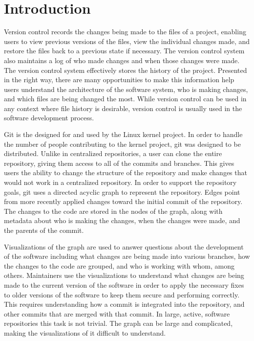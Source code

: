 \chapter{Introduction}

Version control records the changes being made to the files of a
project, enabling users to view previous versions of the files, view the
individual changes made, and restore the files back to a previous state
if necessary. The version control system also maintains a log of who
made changes and when those changes were made. The version control
system effectively stores the history of the project. Presented in the
right way, there are many opportunities to make this information help
users understand the architecture of the software system, who is making
changes, and which files are being changed the most. While version
control can be used in any context where file history is desirable,
version control is usually used in the software development process.

Git is the  designed for and used by
the Linux kernel project. In order to handle the number of people
contributing to the kernel project, git was designed to be distributed.
Unlike in centralized repositories, a user can clone the entire
repository, giving them access to all of the commits and branches. This
gives users the ability to change the structure of the repository and
make changes that would not work in a centralized repository. In order
to support the repository goals, git uses a directed acyclic graph to
represent the repository. Edges point from more recently applied changes
toward the initial commit of the repository. The changes to the code are
stored in the nodes of the graph, along with metadata about who is
making the changes, when the changes were made, and the parents of the
commit.

Visualizations of the graph are used to answer questions about the
development of the software including what changes are being made into
various branches, how the changes to the code are grouped, and who is
working with whom, among others. Maintainers use the visualizations to
understand what changes are being made to the current version of the
software in order to apply the necessary fixes to older versions of the
software to keep them secure and performing correctly. This requires
understanding how a commit is integrated into the repository, and other
commits that are merged with that commit. In large, active, software
repositories this task is not trivial. The graph can be large and
complicated, making the visualizations of it difficult to understand.


